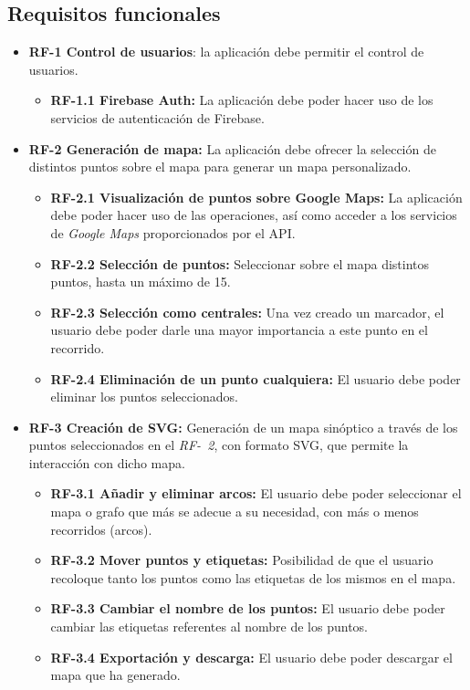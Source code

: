 \subsection{Requisitos funcionales}
\begin{itemize}
	\item \textbf{RF-1 Control de usuarios}: la aplicación debe permitir el control de usuarios.
	\begin{itemize}
		\item \textbf{RF-1.1 Firebase Auth:} La aplicación debe poder hacer uso de los servicios de autenticación de Firebase.
	\end{itemize}
	\item \textbf{RF-2 Generación de mapa:} La aplicación debe ofrecer la selección de distintos puntos sobre el mapa para generar un mapa personalizado.
	\begin{itemize}
		\item \textbf{RF-2.1 Visualización de puntos sobre Google Maps:} La aplicación debe poder hacer uso de las operaciones, así como acceder a los servicios de \textit{Google Maps} proporcionados por el API.
		\item \textbf{RF-2.2 Selección de puntos:} Seleccionar sobre el mapa distintos puntos, hasta un máximo de 15.
		\item \textbf{RF-2.3 Selección como centrales:} Una vez creado un marcador, el usuario debe poder darle una mayor importancia a este punto en el recorrido.
		\item \textbf{RF-2.4 Eliminación de un punto cualquiera:} El usuario debe poder eliminar los puntos seleccionados.
	\end{itemize}
	\item \textbf{RF-3 Creación de SVG:} Generación de un mapa sinóptico a través de los puntos seleccionados en el \textit{RF-~2}, con formato SVG, que permite la interacción con dicho mapa.
	\begin{itemize}
		\item \textbf{RF-3.1 Añadir y eliminar arcos:} El usuario debe poder seleccionar el mapa o grafo que más se adecue a su necesidad, con más o menos recorridos (arcos).
		\item \textbf{RF-3.2 Mover puntos y etiquetas:} Posibilidad de que el usuario recoloque tanto los puntos como las etiquetas de los mismos en el mapa.
		\item \textbf{RF-3.3 Cambiar el nombre de los puntos:} El usuario debe poder cambiar las etiquetas referentes al nombre de los puntos.
		\item \textbf{RF-3.4 Exportación y descarga:} El usuario debe poder descargar el mapa que ha generado.
	\end{itemize}
\end{itemize}


